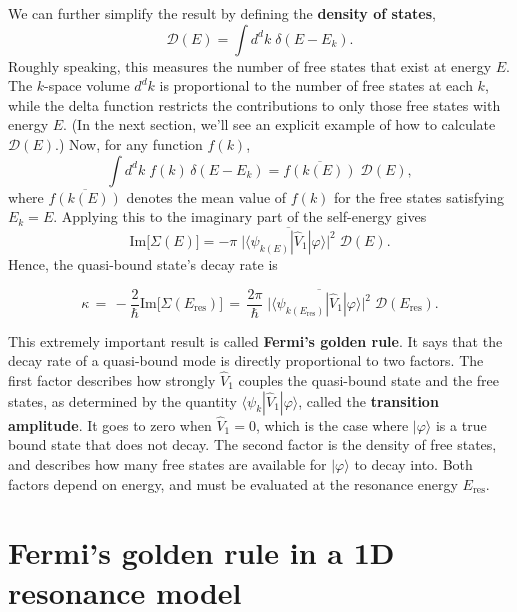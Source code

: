 \documentclass[pra,12pt]{revtex4}
\begin{document}
We can further simplify the result by defining the \textbf{density of
  states},
\begin{equation}
  \mathcal{D}(E) = \int d^d k\; \delta(E - E_k).
\end{equation}
Roughly speaking, this measures the number of free states that exist
at energy $E$.  The $k$-space volume $d^dk$ is proportional to the
number of free states at each $k$, while the delta function restricts
the contributions to only those free states with energy $E$.  (In
the next section, we'll see an explicit example of how to calculate
$\mathcal{D}(E)$.)  Now, for any function $f(k)$,
\begin{equation}
  \int d^d k\; f(k) \, \delta(E - E_k) = \overline{f(k(E))} \;\mathcal{D}(E),
\end{equation}
where $\overline{f(k(E))}$ denotes the mean value of $f(k)$ for the
free states satisfying $E_k = E$.  Applying this to the imaginary part
of the self-energy gives
\begin{equation}
  \mathrm{Im}\big[\Sigma(E)\big] = - \pi \; \overline{\Big| \langle\psi_{k(E)}| \hat{V}_1|\varphi\rangle\Big|^2} \; \mathcal{D}(E).
\end{equation}
Hence, the quasi-bound state's decay rate is
\begin{framed}
  \begin{equation}
    \kappa \,=\, -\frac{2}{\hbar}\mathrm{Im}\big[\Sigma(E_{\mathrm{res}})\big] \,=\, \frac{2\pi}{\hbar} \; \overline{\Big| \langle\psi_{k(E_{\mathrm{res}})}| \hat{V}_1|\varphi\rangle\Big|^2} \; \mathcal{D}(E_{\mathrm{res}}).
  \end{equation}
\end{framed}
\vskip -0.15in
This extremely important result is called \textbf{Fermi's golden
  rule}.  It says that the decay rate of a quasi-bound mode is
directly proportional to two factors.  The first factor describes how
strongly $\hat{V}_1$ couples the quasi-bound state and the free
states, as determined by the quantity $\langle\psi_{k}|
\hat{V}_1|\varphi\rangle$, called the \textbf{transition amplitude}.
It goes to zero when $\hat{V}_1 = 0$, which is the case where
$|\varphi\rangle$ is a true bound state that does not decay.  The
second factor is the density of free states, and describes how many
free states are available for $|\varphi\rangle$ to decay into.  Both
factors depend on energy, and must be evaluated at the resonance
energy $E_{\mathrm{res}}$.

\section{Fermi's golden rule in a 1D resonance model}
\end{document}
